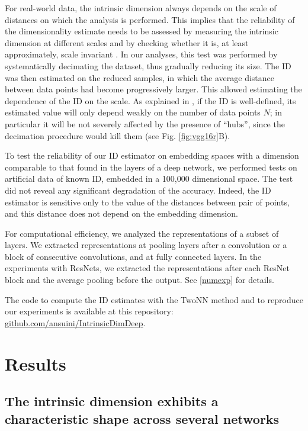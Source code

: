 \documentclass{article}
\begin{document}
For real-world data, the intrinsic dimension always depends on the scale of distances on which the analysis is performed. This implies that the reliability of the dimensionality estimate needs to be assessed by measuring the intrinsic dimension at different scales and by checking whether it is, at least approximately, scale invariant \cite{facco2017estimating}. In our analyses, this test was performed by systematically decimating the dataset, thus gradually reducing its size. The ID was then estimated on the reduced samples, in which the average distance between data points had become progressively larger. 
This allowed estimating the dependence of the ID on the scale.
As explained in \cite{facco2017estimating}, if the ID is well-defined, its estimated value will only depend weakly on the number of data points $N$; in particular it will be not severely affected by the presence of “hubs”, since the decimation procedure would kill them (see Fig. \ref{fig:vgg16r}B).%

To test the reliability of our ID estimator on embedding spaces with a dimension comparable to that found in the layers of a deep network, we performed  tests on artificial data of known ID, embedded in a 100,000 dimensional space. The test did not reveal any significant degradation of the  accuracy. Indeed, the ID estimator is sensitive only to the value of the distances between pair of points, and this distance does not depend on the embedding dimension.

For computational efficiency, we analyzed the representations of a subset of layers. We extracted representations at pooling layers after a convolution or a block of consecutive convolutions, and at fully connected layers. In the experiments with ResNets, we extracted the representations after each ResNet block \cite{He2015} and the average pooling before the output.
See \ref{numexp} for details. 

The code to compute the ID estimates with the TwoNN method and to reproduce our experiments is available at this repository: \href{https://github.com/ansuini/IntrinsicDimDeep}{github.com/ansuini/IntrinsicDimDeep}.

\section{Results}

\subsection{The intrinsic dimension exhibits a characteristic shape across several networks}\label{subsec:hunchbacks}
\end{document}
